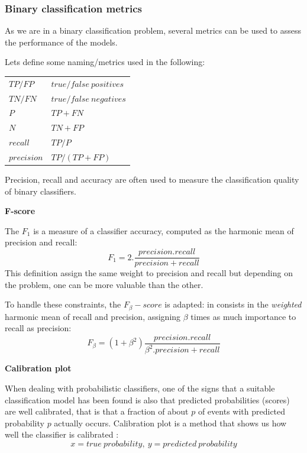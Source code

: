 \subsubsection{Binary classification metrics}

As we are in a binary classification problem, several metrics can be used to assess the performance of the models.

Lets define some naming/metrics used in the following:

{\ttfamily
\begin{table}[H]
    \centering
    \begin{tabular}{ll}
        \toprule
        $TP / FP$          &    $true/false\ positives$ \\
        $TN / FN$       &    $true/false\ negatives$  \\
        $P$       &    $TP+FN$ \\
        $N$    &    $TN + FP$ \\
        $recall$      &    ${TP} / {P}$ \\
        $precision$        &   ${TP} / {(TP+FP)}$ \\
        \bottomrule
    \end{tabular}
\end{table}
}

Precision, recall and accuracy are often used to measure the classification quality of binary classifiers.


\textbf{F-score}

The $F_1$ is a measure of a classifier accuracy, computed as the harmonic mean of precision and recall: $$F_1= 2. \frac{precision.recall}{precision+recall}$$\tabularnewline
This definition assign the same weight to precision and recall but depending on the problem, one can be more valuable than the other.

To handle these constraints, the $F_\beta-score$ is adapted: in consists in the \textit{weighted} harmonic mean of recall and precision, assigning $\beta$ times as much importance to recall as precision: $$F_\beta = (1+\beta^2) \frac{precision.recall}{\beta^2.precision+recall}$$

\textbf{Calibration plot} 

When dealing with probabilistic classifiers, one of the signs that a suitable classification model has been found is also that predicted probabilities (scores) are well calibrated, that is that a fraction of about $p$ of events with predicted probability $p$ actually occurs. Calibration plot is a method that shows us how well the classifier is calibrated \cite{Calibration}: $$x = true\ probability,\ y=predicted\ probability$$


